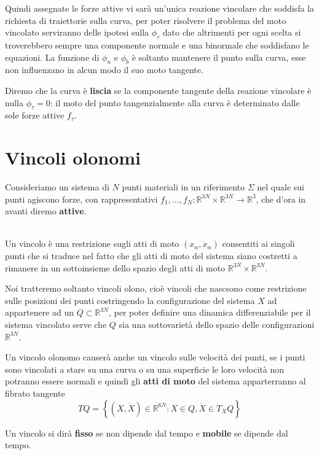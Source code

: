 \documentclass[11pt,a4paper,twoside]{book}
\newenvironment{definizione}[1][\empty]{\begin{Definizione}{
\ifx\empty#1\relax\else\mdseries\itshape#1\\\fi
}{}}{\end{Definizione}}
\theoremstyle{esss}
\theoremstyle{dotless}
\numberwithin{equation}{section} %
\begin{document}
Quindi assegnate le forze attive vi sarà un'unica reazione vincolare che soddisfa la richiesta di traiettorie sulla curva, per poter risolvere il problema del moto vincolato serviranno delle ipotesi sulla $\phi_\tau$ dato che altrimenti per ogni scelta si troverebbero sempre una componente normale e una binormale che soddisfano le equazioni.
La funzione di $\phi_n$ e $\phi_b$ è soltanto mantenere il punto sulla curva, esse non influenzano in alcun modo il suo moto tangente.

Diremo che la curva è \textbf{liscia} se la componente tangente della reazione vincolare è nulla $\phi_\tau=0$: il moto del punto tangenzialmente alla curva è determinato dalle sole forze attive $f_\tau$.



\section{Vincoli olonomi} 

Consideriamo un sistema di $N$ punti materiali in un riferimento $\Sigma$ nel quale sui punti agiscono forze, con rappresentativi $f_1,...,f_N:\mathbb{R}^{3N}\times\mathbb{R}^{3N}\rightarrow\mathbb{R}^3$, che d'ora in avanti diremo \textbf{attive}.

\begin{definizione}
Un vincolo è una restrizione sugli atti di moto $(x_\alpha,\dot{x}_\alpha)$ consentiti ai singoli punti che si traduce nel fatto che gli atti di moto del sistema siano costretti a rimanere in un sottoinsieme dello spazio degli atti di moto $\mathbb{R}^{3N}\times\mathbb{R}^{3N}$.
\end{definizione}
Noi tratteremo soltanto vincoli olono, cioè vincoli che nascsono come restrizione sulle posizioni dei punti costringendo la configurazione del sistema $X$ ad appartenere ad un $Q\subset\mathbb{R}^{3N}$, per poter definire una dinamica differenziabile per il sistema vincolato serve che $Q$ sia una sottovarietà dello spazio delle configurazioni $\mathbb{R}^{3N}$.

Un vincolo olonomo causerà anche un vincolo sulle velocità dei punti, se i punti sono vincolati a stare su una curva o su una superficie le loro velocità non potranno essere normali e quindi gli \textbf{atti di moto} del sistema apparterranno al fibrato tangente
\[
TQ=\left\{ (X,\dot{X})\in\mathbb{R}^{6N} : X\in Q, \dot{X}\in T_XQ \right\}
\]


Un vincolo si dirà \textbf{fisso} se non dipende dal tempo e \textbf{mobile} se dipende dal tempo.
\end{document}
